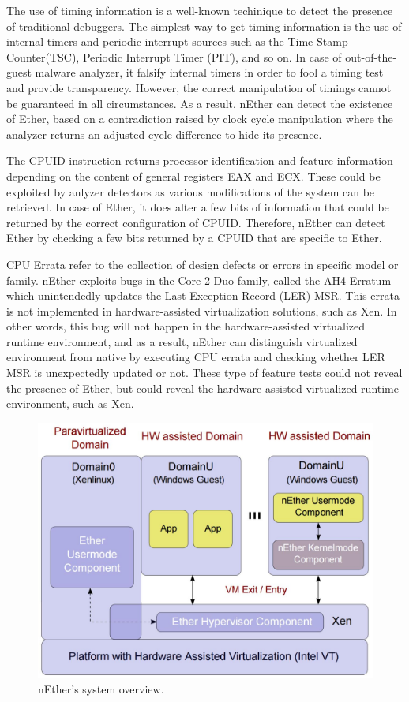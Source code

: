 The use of timing information is a well-known techinique to detect the presence
of traditional debuggers. The simplest way to get timing information is the use
of internal timers and periodic interrupt sources such as the Time-Stamp
Counter(TSC), Periodic Interrupt Timer (PIT), and so on. In case of
out-of-the-guest malware analyzer, it falsify internal timers in order to fool a
timing test and provide transparency. However, the correct manipulation of
timings cannot be guaranteed in all circumstances. As a result, nEther can
detect the existence of Ether, based on a contradiction raised by clock cycle
manipulation where the analyzer returns an adjusted cycle difference to hide its
presence.

The CPUID instruction returns processor identification and feature information 
depending on the content of general registers EAX and ECX. These could be exploited 
by anlyzer detectors as various modifications of the system can be retrieved. 
In case of Ether, it does alter a few bits of information that could be returned 
by the correct configuration of CPUID. Therefore, nEther can detect Ether 
by checking a few bits returned by a CPUID that are specific to Ether.

CPU Errata refer to the collection of design defects or errors in specific model
or family. nEther exploits bugs in the Core 2 Duo family, called the AH4 Erratum
which unintendedly updates the Last Exception Record (LER) MSR. This errata is
not implemented in hardware-assisted virtualization solutions, such as Xen. In
other words, this bug will not happen in the hardware-assisted virtualized
runtime environment, and as a result, nEther can distinguish virtualized
environment from native by executing CPU errata and checking whether LER MSR is
unexpectedly updated or not. These type of feature tests could not reveal the
presence of Ether, but could reveal the hardware-assisted virtualized runtime
environment, such as Xen.

\begin{figure}[!h]
	\centering
	\includegraphics[width=\linewidth]{figure/nether.png}
	\caption{nEther's system overview.}
	\label{fig:nether}
\end{figure}


